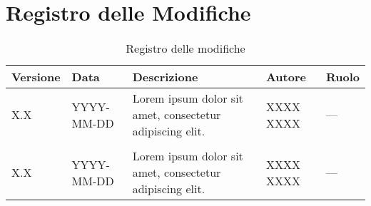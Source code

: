 \section{Registro delle Modifiche}
\begin{table}[ht!]	
		\centering
		\begin{tabular}{p{1.2cm} p{2cm} p{6cm} p{3cm} p{2cm}}
			\toprule
			\textbf{Versione}& \textbf{Data} & \textbf{Descrizione} & \textbf{Autore} & \textbf{Ruolo} \\
			\midrule
			X.X & YYYY-MM-DD & Lorem ipsum dolor sit amet, consectetur adipiscing elit.  & XXXX XXXX &
			--- \\\\ %
			X.X & YYYY-MM-DD & Lorem ipsum dolor sit amet, consectetur adipiscing elit.  & XXXX XXXX & --- \\
			\bottomrule
		\end{tabular}
		\caption{Registro delle modifiche}
		\label{table:Registro delle modifiche}
\end{table}